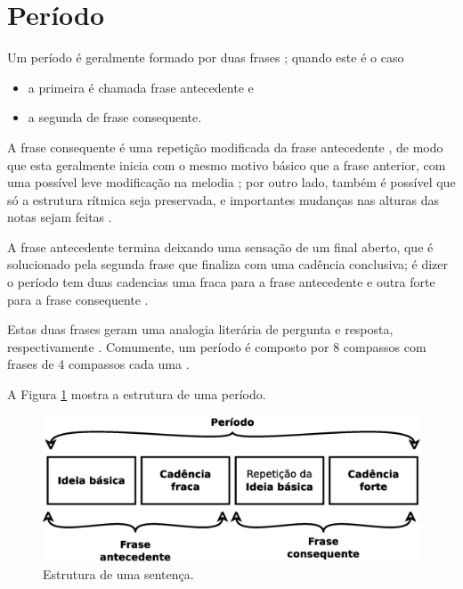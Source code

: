 \section{Período}
\label{sec:Periodo}



Um período é geralmente formado por duas frases \cite[pp. 350]{duckworth2007creative} \cite[pp. 336]{medteoria};
quando este é o caso 
\begin{itemize}  
\item a primeira é chamada frase antecedente e 
\item a segunda de frase consequente.
\end{itemize}

A frase consequente é uma repetição modificada da frase antecedente 
\cite[pp. 53,55]{schoenberg1990fundamentos} \cite[pp. 25,29]{schoenberg1967fundamentals},
de modo que esta geralmente inicia com o mesmo motivo básico que a frase anterior,
com uma possível leve modificação na melodia
\cite[pp. 51]{schoenberg1990fundamentos} \cite[pp. 25]{schoenberg1967fundamentals};
por outro lado, também é possível que só a estrutura rítmica seja preservada,
e importantes mudanças nas alturas das notas sejam feitas
\cite[pp. 57]{schoenberg1990fundamentos} \cite[pp. 30]{schoenberg1967fundamentals}.


A frase antecedente termina deixando uma sensação de um final aberto, 
que é solucionado pela segunda frase que finaliza com uma cadência conclusiva;
é dizer o período tem duas cadencias uma fraca para a frase antecedente e 
outra forte para a frase consequente 
\cite[pp. 350]{duckworth2007creative} \cite[pp. 336]{medteoria} \cite[pp. 1176]{latham2008diccionario}
\cite[pp. 25,29]{schoenberg1967fundamentals}.

Estas duas frases geram uma analogia literária de pergunta e resposta, respectivamente \cite[pp. 336]{medteoria}.
Comumente, um período é composto por 8 compassos com frases de 4 compassos cada uma \cite[pp. 25]{schoenberg1967fundamentals}.

A Figura \ref{fig:periodostruct} mostra a estrutura de uma período. 
\begin{figure}[!h]
  \centering
    \includegraphics[width=\textwidth]{chapters/cap-musica-composer/periodo.eps}
\caption{Estrutura de uma sentença.}
\label{fig:periodostruct}
\end{figure}

